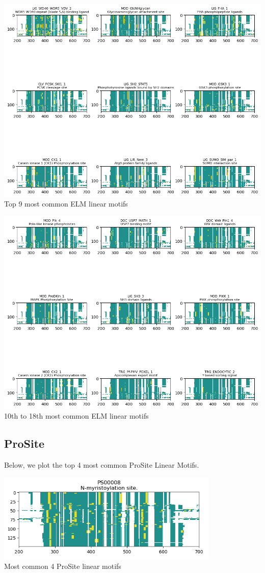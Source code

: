 \documentclass[10pt,twocolumn,letterpaper]{article}
\begin{document}
\label{sec:elm_motifs}
\begin{center}
    \includegraphics[scale=0.8]{report/img/Elm1.png} \\
    \small{Top 9 most common ELM linear motifs}
\end{center}
\begin{center}
    \includegraphics[scale=0.8]{report/img/Elm2.png} \\
    \small{10th to 18th most common ELM linear motifs}
\end{center}

\newpage
\subsection{ProSite}

Below, we plot the top 4 most common ProSite Linear Motifs. \\

\begin{center}
    \includegraphics[scale=0.58]{report/img/Prosite.png} \\
    \small{Most common 4 ProSite linear motifs}
\end{center}
\end{document}
